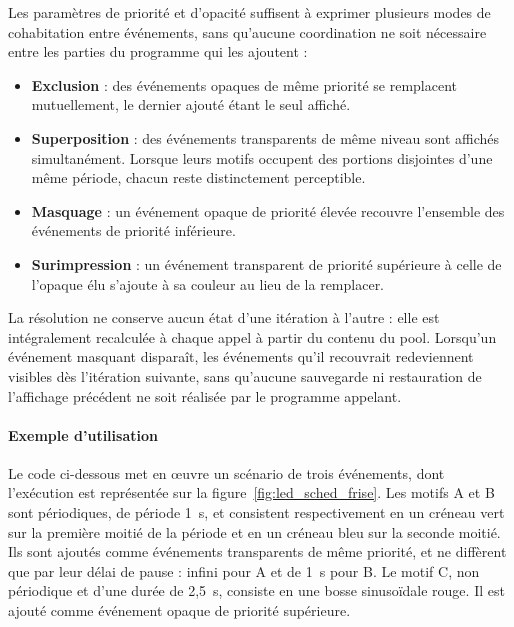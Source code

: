 \vspace{0.4cm}

Les paramètres de priorité et d'opacité suffisent à exprimer plusieurs modes de cohabitation entre événements, sans qu'aucune
coordination ne soit nécessaire entre les parties du programme qui les ajoutent :
\begin{itemize}
    \item \textbf{Exclusion} : des événements opaques de même priorité se remplacent mutuellement, le dernier ajouté étant le
	seul affiché.
    \item \textbf{Superposition} : des événements transparents de même niveau sont affichés simultanément. Lorsque leurs motifs
	occupent des portions disjointes d'une même période, chacun reste distinctement perceptible.
    \item \textbf{Masquage} : un événement opaque de priorité élevée recouvre l'ensemble des événements de priorité inférieure.
    \item \textbf{Surimpression} : un événement transparent de priorité supérieure à celle de l'opaque élu s'ajoute à sa couleur
	au lieu de la remplacer.
\end{itemize}

La résolution ne conserve aucun état d'une itération à l'autre : elle est intégralement recalculée à chaque appel à partir du
contenu du pool. Lorsqu'un événement masquant disparaît, les événements qu'il recouvrait redeviennent visibles dès l'itération
suivante, sans qu'aucune sauvegarde ni restauration de l'affichage précédent ne soit réalisée par le programme appelant.

\newpage

\paragraph{Exemple d'utilisation} Le code ci-dessous met en \oe uvre un scénario de trois événements, dont l'exécution est
représentée sur la figure~\ref{fig:led_sched_frise}. Les motifs A et B sont périodiques, de période 1~s, et consistent
respectivement en un créneau vert sur la première moitié de la période et en un créneau bleu sur la seconde moitié. Ils sont
ajoutés comme événements transparents de même priorité, et ne diffèrent que par leur délai de pause : infini pour A et de 1~s
pour B. Le motif C, non périodique et d'une durée de 2,5~s, consiste en une bosse sinusoïdale rouge. Il est ajouté comme
événement opaque de priorité supérieure.

\vfill

